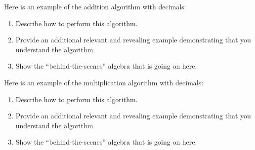 \documentclass[nooutcomes]{ximera}
\begin{document}
\begin{problem}Here is an example of the addition algorithm with decimals:
\begin{image}
\end{image}

\begin{enumerate}
\item Describe how to perform this algorithm.
\item Provide an additional relevant and revealing example
  demonstrating that you understand the algorithm.
\item Show the ``behind-the-scenes'' algebra that is going on here.
\end{enumerate}
\end{problem} 

\begin{problem}Here is an example of the multiplication algorithm with
  decimals:
\begin{image}
\end{image}
\begin{enumerate}
\item Describe how to perform this algorithm.
\item Provide an additional relevant and revealing example
  demonstrating that you understand the algorithm.
\item Show the ``behind-the-scenes'' algebra that is going on here.
\end{enumerate}
\end{problem} 
\end{document}
